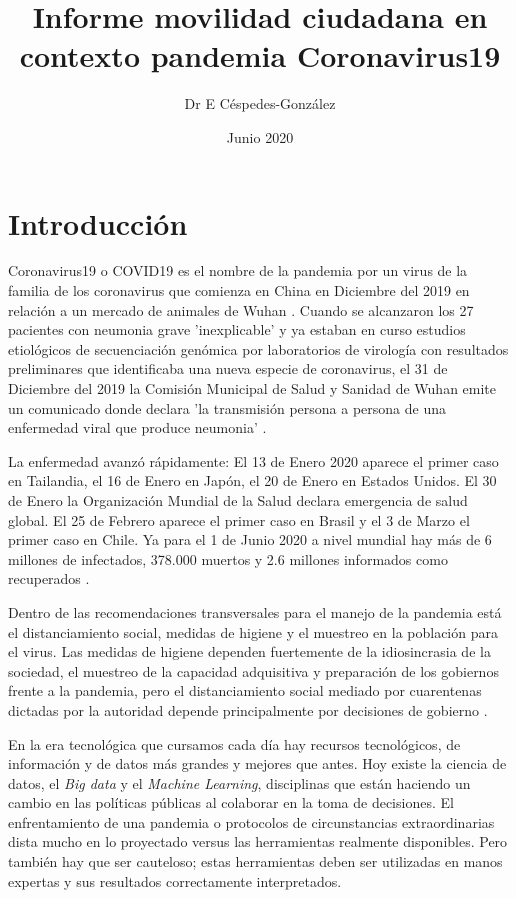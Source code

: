 \documentclass{article}
\title{Informe movilidad ciudadana en contexto pandemia Coronavirus19}
\author{Dr E Céspedes-González}
\date{Junio 2020}
\begin{document}
\maketitle


\section{Introducción}

Coronavirus19 o COVID19 es el nombre de la pandemia por un virus de la familia de los coronavirus que comienza en China en Diciembre del 2019 en relación a un mercado de animales de Wuhan \cite{wang_novel_2020}. Cuando se alcanzaron los 27 pacientes con neumonia grave 'inexplicable' y ya estaban en curso estudios etiológicos de secuenciación genómica por laboratorios de virología con resultados preliminares que identificaba una nueva especie de coronavirus, el 31 de Diciembre del 2019 la Comisión Municipal de Salud y Sanidad de Wuhan emite un comunicado donde declara 'la transmisión persona a persona de una enfermedad viral que produce neumonia' \cite{oms_oms_2020}.

La enfermedad avanzó rápidamente:  El 13 de Enero 2020 aparece el primer caso en Tailandia, el 16 de Enero en Japón, el 20 de Enero en Estados Unidos. El 30 de Enero la Organización Mundial de la Salud declara emergencia de salud global. El 25 de Febrero aparece el primer caso en Brasil y el 3 de Marzo el primer caso en Chile. Ya para el 1 de Junio 2020 a nivel mundial hay más de 6 millones de infectados, 378.000 muertos y 2.6 millones informados como recuperados \cite{oms_covid-19_2020}.

Dentro de las recomendaciones transversales para el manejo de la pandemia está el distanciamiento social, medidas de higiene y el muestreo en la población para el virus. Las medidas de higiene dependen fuertemente de la idiosincrasia de la sociedad, el muestreo de la capacidad adquisitiva y preparación de los gobiernos frente a la pandemia, pero el distanciamiento social mediado por cuarentenas dictadas por la autoridad depende principalmente por decisiones de gobierno \cite{painter_political_2020, organization_critical_2020}.

En la era tecnológica que cursamos cada día hay recursos tecnológicos, de información y de datos más grandes y mejores que antes. Hoy existe la ciencia de datos, el \textit{Big data} y el \textit{Machine Learning}, disciplinas que están haciendo un cambio en las políticas públicas al colaborar en la toma de decisiones. El enfrentamiento de una pandemia o protocolos de circunstancias extraordinarias dista mucho en lo proyectado versus las herramientas realmente disponibles. Pero también hay que ser cauteloso; estas herramientas deben ser utilizadas en manos expertas y sus resultados correctamente interpretados.
\end{document}
